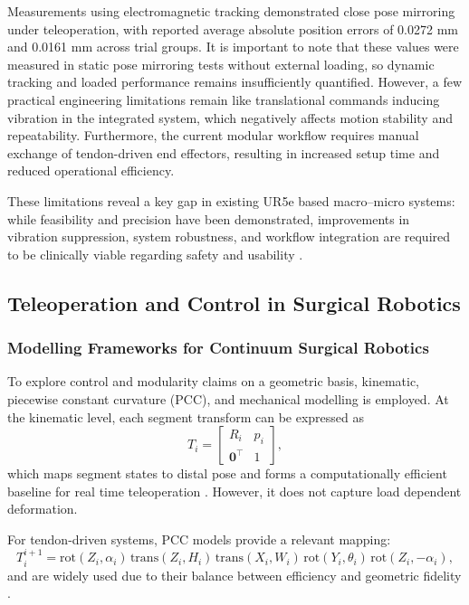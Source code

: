 \documentclass[12pt]{article}
\begin{document}
Measurements using electromagnetic tracking demonstrated close pose
mirroring under teleoperation, with reported average absolute position errors
of 0.0272 mm and 0.0161 mm across trial groups. It is important to note that 
these values were measured in static pose mirroring tests
without external loading, so dynamic tracking and loaded performance remains
insufficiently quantified.
However, a few practical engineering limitations remain like
translational commands inducing vibration in
the integrated system, which negatively affects motion stability and repeatability.
Furthermore, the current modular workflow requires manual exchange of
tendon-driven end effectors, resulting in increased setup time and reduced
operational efficiency.

These limitations reveal a key gap in existing UR5e based macro--micro
systems: while feasibility and precision have been demonstrated, improvements in
vibration suppression, system robustness, and workflow integration are required
to be clinically viable regarding safety and usability \cite{scott2023macro, razjigaev2021snakeraven, seetohul2022snake}.

\subsection{Teleoperation and Control in Surgical Robotics}
\subsubsection{Modelling Frameworks for Continuum Surgical Robotics}
To explore control and modularity claims on a geometric basis, kinematic, piecewise constant curvature (PCC), and mechanical modelling is employed.
At the kinematic level, each segment transform can be expressed as
\begin{equation}
T_i =
\begin{bmatrix}
R_i & p_i \\
\mathbf{0}^\top & 1
\end{bmatrix},
\end{equation}
which maps segment states to distal pose and forms a computationally efficient
baseline for real time teleoperation
\cite{burgnerkahrs2015continuum, dupont2022continuum}. However, it does not
capture load dependent deformation.

For tendon-driven systems, PCC models provide a relevant
mapping:
\begin{equation}
T_i^{i+1} =
\mathrm{rot}(Z_i,\alpha_i)\,
\mathrm{trans}(Z_i,H_i)\,
\mathrm{trans}(X_i,W_i)\,
\mathrm{rot}(Y_i,\theta_i)\,
\mathrm{rot}(Z_i,-\alpha_i),
\end{equation}
and are widely used due to their balance between efficiency and geometric
fidelity \cite{wang2022fiora, dupont2022continuum}.
\end{document}
